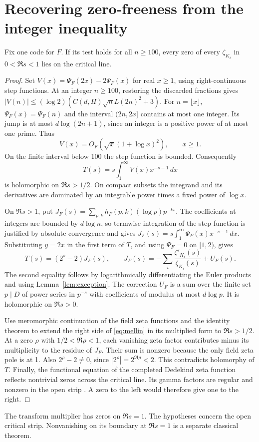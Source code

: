 \documentclass[11pt]{article}
\begin{document}
\section{Recovering zero-freeness from the integer inequality}\label{sec:reverse}
\begin{proposition}\label{prop:reverse}
Fix one code for \(F\). If its test holds for all \(n\ge100\), every zero of every \(\zeta_{K_i}\) in \(0<\Re s<1\) lies on the critical line.
\end{proposition}
\begin{proof}
Set \(V(x)=\Psi_F(2x)-2\Psi_F(x)\) for real \(x\ge1\), using right-continuous step functions. At an integer \(n\ge100\), restoring the discarded fractions gives
\(|V(n)|\le(\log2)(C(d,H)\sqrt n L(2n)^2+3)\).
For \(n=\lfloor x\rfloor\), \(\Psi_F(x)=\Psi_F(n)\) and the interval \((2n,2x]\) contains at most one integer. Its jump is at most \(d\log(2n+1)\), since an integer is a positive power of at most one prime. Thus
\[
  V(x)=O_F\!\left(\sqrt{x}(1+\log x)^2\right),\qquad x\ge1.
\]
On the finite interval below 100 the step function is bounded. Consequently
\[
  T(s)=s\int_1^\infty V(x)x^{-s-1}\,dx
\]
is holomorphic on \(\Re s>1/2\). On compact subsets the integrand and its derivatives are dominated by an integrable power times a fixed power of \(\log x\).

On \(\Re s>1\), put \(J_F(s)=\sum_{p,k}h_F(p,k)(\log p)p^{-ks}\). The coefficients at integers are bounded by \(d\log n\), so termwise integration of the step function is justified by absolute convergence and gives \(J_F(s)=s\int_1^\infty\Psi_F(x)x^{-s-1}\,dx\). Substituting \(y=2x\) in the first term of \(T\), and using \(\Psi_F=0\) on \([1,2)\), gives
\begin{equation}\label{eq:mellin}
 T(s)=(2^s-2)J_F(s),\qquad
 J_F(s)=-\sum_i\frac{\zeta'_{K_i}(s)}{\zeta_{K_i}(s)}+U_F(s).
\end{equation}
The second equality follows by logarithmically differentiating the Euler products and using Lemma~\ref{lem:exception}. The correction \(U_F\) is a sum over the finite set \(p\mid D\) of power series in \(p^{-s}\) with coefficients of modulus at most \(d\log p\). It is holomorphic on \(\Re s>0\).

Use meromorphic continuation of the field zeta functions and the identity theorem to extend the right side of \eqref{eq:mellin} in its multiplied form to \(\Re s>1/2\). At a zero \(\rho\) with \(1/2<\Re\rho<1\), each vanishing zeta factor contributes minus its multiplicity to the residue of \(J_F\). Their sum is nonzero because the only field zeta pole is at 1. Also \(2^\rho-2\ne0\), since \(|2^\rho|=2^{\Re\rho}<2\). This contradicts holomorphy of \(T\). Finally, the functional equation of the completed Dedekind zeta function reflects nontrivial zeros across the critical line. Its gamma factors are regular and nonzero in the open strip \cite[eq.~(2.3)]{gm}. A zero to the left would therefore give one to the right.
\end{proof}
The transform multiplier has zeros on \(\Re s=1\). The hypotheses concern the open critical strip. Nonvanishing on its boundary at \(\Re s=1\) is a separate classical theorem.
\newpage
\end{document}
